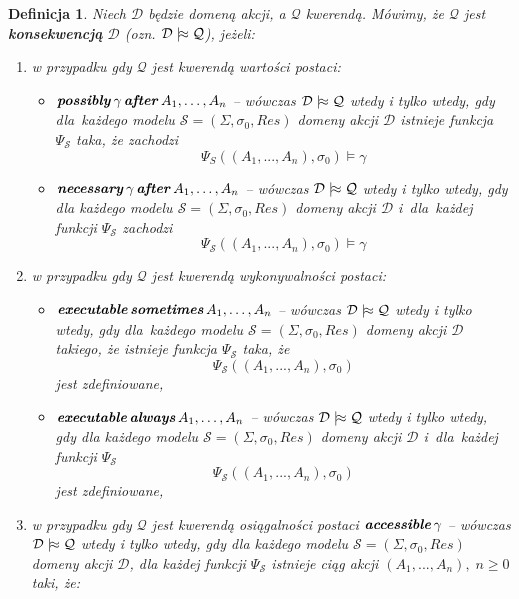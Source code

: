 \documentclass[11pt,a4paper]{article}
\newtheorem{defn}{Definicja}
\DeclareMathOperator{\After}{\textbf{\textit{after}}}
\DeclareMathOperator{\Always}{\textbf{\textit{always}}}
\DeclareMathOperator{\Sometimes}{\textbf{\textit{sometimes}}}
\DeclareMathOperator{\Executable}{\textbf{\textit{executable}}}
\DeclareMathOperator{\Accessible}{\textbf{\textit{accessible}}}
\DeclareMathOperator{\Possibly}{\textbf{\textit{possibly}}}
\DeclareMathOperator{\Necessary}{\textbf{\textit{necessary}}}
\def\consequence{\mathrel|\joinrel\approx}
\begin{document}
\begin{defn}
    \label{defn:consequence}
    Niech $\mathcal{D}$ będzie domeną akcji, a $\mathcal{Q}$ kwerendą. 
    Mówimy, że $\mathcal{Q}$ jest \textbf{konsekwencją} $\mathcal{D}$ (ozn. $\mathcal{D} \consequence \mathcal{Q}$), jeżeli:

    \begin{enumerate}
        \item w przypadku gdy $\mathcal{Q}$ jest kwerendą wartości postaci:
        \begin{itemize}
            \item $\Possibly \gamma \After A_1, \dots, A_n$ -- wówczas $\mathcal{D} \consequence \mathcal{Q}$ wtedy i tylko wtedy, gdy dla~każdego modelu %
            $\mathcal{S} = (\Sigma,\sigma_0,Res)$ domeny akcji $\mathcal{D}$ istnieje funkcja $\Psi_\mathcal{S}$ taka, że zachodzi $$\Psi_S((A_1,...,A_n),\sigma_{0}) \models \gamma$$
            \item $\Necessary \gamma \After A_1, \dots, A_n$ -- wówczas $\mathcal{D} \consequence \mathcal{Q}$ wtedy i tylko wtedy, gdy dla każdego modelu %
            $\mathcal{S} = (\Sigma,\sigma_0,Res)$ domeny akcji $\mathcal{D}$ i~dla~każdej funkcji $\Psi_\mathcal{S}$ zachodzi $$\Psi_\mathcal{S}((A_1,...,A_n),\sigma_{0}) \models \gamma$$
        \end{itemize}
        \item w przypadku gdy $\mathcal{Q}$ jest kwerendą wykonywalności postaci:
        \begin{itemize}
            \item $\Executable \Sometimes A_1, \dots, A_n$ -- wówczas $\mathcal{D} \consequence \mathcal{Q}$ wtedy i tylko wtedy, gdy dla~każdego modelu %
            $\mathcal{S} = (\Sigma,\sigma_0,Res)$ domeny akcji $\mathcal{D}$ takiego, że istnieje %
            funkcja $\Psi_\mathcal{S}$ taka, że
            $$\Psi_\mathcal{S}((A_1,...,A_n),\sigma_{0})$$
            jest zdefiniowane,
            \item $\Executable \Always A_1, \dots, A_n$ -- wówczas $\mathcal{D} \consequence \mathcal{Q}$ wtedy i tylko wtedy, gdy dla każdego modelu %
            $\mathcal{S} = (\Sigma,\sigma_0,Res)$ domeny akcji $\mathcal{D}$ i~dla~każdej funkcji $\Psi_\mathcal{S}$
            $$\Psi_\mathcal{S}((A_1,...,A_n),\sigma_{0})$$
            jest zdefiniowane,
        \end{itemize}
        \item w przypadku gdy $\mathcal{Q}$ jest kwerendą osiągalności postaci $\Accessible \gamma$ -- wówczas $\mathcal{D} \consequence \mathcal{Q}$ wtedy i tylko wtedy, gdy dla każdego modelu $\mathcal{S} = (\Sigma,\sigma_0,Res)$ domeny akcji $\mathcal{D}$, dla każdej funkcji $\Psi_\mathcal{S}$ istnieje ciąg akcji $(A_1,...,A_n), \; n \geq 0$ taki, że:

\end{enumerate}
\end{defn}
\end{document}
